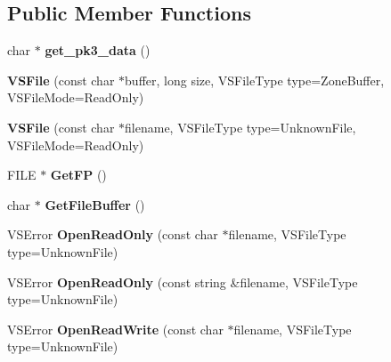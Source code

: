 \subsection*{Public Member Functions}
\begin{DoxyCompactItemize}
\item 
char $\ast$ {\bfseries get\+\_\+pk3\+\_\+data} ()\hypertarget{classVSFileSystem_1_1VSFile_a1c8c896dcf7dc7aa9db2ff0c6de3feb7}{}\label{classVSFileSystem_1_1VSFile_a1c8c896dcf7dc7aa9db2ff0c6de3feb7}

\item 
{\bfseries V\+S\+File} (const char $\ast$buffer, long size, V\+S\+File\+Type type=Zone\+Buffer, V\+S\+File\+Mode=Read\+Only)\hypertarget{classVSFileSystem_1_1VSFile_ae7edbda898e7a6b2fb39c7ffe549b7dc}{}\label{classVSFileSystem_1_1VSFile_ae7edbda898e7a6b2fb39c7ffe549b7dc}

\item 
{\bfseries V\+S\+File} (const char $\ast$filename, V\+S\+File\+Type type=Unknown\+File, V\+S\+File\+Mode=Read\+Only)\hypertarget{classVSFileSystem_1_1VSFile_a2dd43056c699bb37ed120ec9b846c91e}{}\label{classVSFileSystem_1_1VSFile_a2dd43056c699bb37ed120ec9b846c91e}

\item 
F\+I\+LE $\ast$ {\bfseries Get\+FP} ()\hypertarget{classVSFileSystem_1_1VSFile_a5b5b4b35aef4fcdc7002e1ee6ac9d1bc}{}\label{classVSFileSystem_1_1VSFile_a5b5b4b35aef4fcdc7002e1ee6ac9d1bc}

\item 
char $\ast$ {\bfseries Get\+File\+Buffer} ()\hypertarget{classVSFileSystem_1_1VSFile_ab770ca34ac60df4341787a87b7dbb028}{}\label{classVSFileSystem_1_1VSFile_ab770ca34ac60df4341787a87b7dbb028}

\item 
V\+S\+Error {\bfseries Open\+Read\+Only} (const char $\ast$filename, V\+S\+File\+Type type=Unknown\+File)\hypertarget{classVSFileSystem_1_1VSFile_a48bbfd9dc6aead3cc9b2a6b3c8d564e5}{}\label{classVSFileSystem_1_1VSFile_a48bbfd9dc6aead3cc9b2a6b3c8d564e5}

\item 
V\+S\+Error {\bfseries Open\+Read\+Only} (const string \&filename, V\+S\+File\+Type type=Unknown\+File)\hypertarget{classVSFileSystem_1_1VSFile_af53ac497695cad50342564f7dbc50b64}{}\label{classVSFileSystem_1_1VSFile_af53ac497695cad50342564f7dbc50b64}

\item 
V\+S\+Error {\bfseries Open\+Read\+Write} (const char $\ast$filename, V\+S\+File\+Type type=Unknown\+File)\hypertarget{classVSFileSystem_1_1VSFile_ad17ade005050a34f00d64e72024c7fec}{}\label{classVSFileSystem_1_1VSFile_ad17ade005050a34f00d64e72024c7fec}


\end{DoxyCompactItemize}
